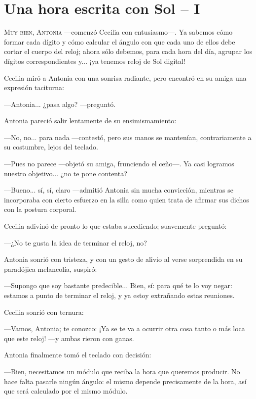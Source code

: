 \chapter{Una hora escrita con Sol -- I}

\lettrine[ante=\raisebox{-1.5ex}{\large ---},lines=2]{M}{uy bien,
  Antonia} ---comenzó Cecilia con en\-tu\-sias\-mo---. Ya sabemos cómo
formar cada dígito y cómo calcular el ángulo con que cada uno de ellos
debe cortar el cuerpo del reloj; ahora sólo debemos, para cada hora
del día, agrupar los dígitos correspondientes y... ¡ya tenemos reloj
de Sol digital!

Cecilia miró a Antonia con una sonrisa radiante, pero encontró en su
amiga una expresión taciturna:

---Antonia... ¿pasa algo?  ---preguntó.

Antonia pareció salir lentamente de su ensimismamiento:

---No, no... para nada ---contestó, pero sus manos se mantenían,
contrariamente a su costumbre, lejos del teclado.

---Pues no parece ---objetó su amiga, frunciendo el ceño---.  Ya casi
logramos nuestro objetivo... ¿no te pone contenta?

---Bueno... sí, sí, claro ---admitió Antonia sin mucha convicción,
mientras se incorporaba con cierto esfuerzo en la silla como quien
trata de afirmar sus dichos con la postura corporal.

Cecilia adivinó de pronto lo que estaba sucediendo; suavemente
preguntó:

---¿No te gusta la idea de terminar el reloj, no?

Antonia sonrió con tristeza, y con un gesto de alivio al verse
sorprendida en su paradójica melancolía, suspiró:

---Supongo que soy bastante predecible... Bien, sí: para qué te lo voy
negar: estamos a punto de terminar el reloj, y ya estoy extrañando
estas reuniones.

Cecilia sonrió con ternura:

---Vamos, Antonia; te conozco: ¡Ya se te va a ocurrir otra cosa tanto
o más loca que este reloj! ---y ambas rieron con ganas.

Antonia finalmente tomó el teclado con decisión:

---Bien, necesitamos un módulo que reciba la hora que queremos
producir. No hace falta pasarle ningún ángulo: el mismo depende
precisamente de la hora, así que será calculado por el mismo módulo.

